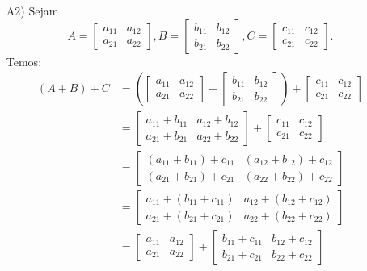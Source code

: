\documentclass[12pt]{exam}
\begin{document}
\begin{itemize}
        \item[A2)] Sejam
        \[
        A = \begin{bmatrix} a_{11} & a_{12}\\a_{21} & a_{22}\end{bmatrix},
        B = \begin{bmatrix} b_{11} & b_{12}\\b_{21} & b_{22}\end{bmatrix},
        C = \begin{bmatrix} c_{11} & c_{12}\\c_{21} & c_{22}\end{bmatrix}.
        \]
        Temos:
        \begin{align*}
            (A + B) + C & = \left(\begin{bmatrix} a_{11} & a_{12}\\a_{21} & a_{22}\end{bmatrix} +
            \begin{bmatrix} b_{11} & b_{12}\\b_{21} & b_{22}\end{bmatrix}\right) +
            \begin{bmatrix} c_{11} & c_{12}\\c_{21} & c_{22}\end{bmatrix}
            \\ &= \begin{bmatrix} a_{11} + b_{11} & a_{12} + b_{12}\\a_{21} + b_{21} & a_{22} + b_{22}\end{bmatrix} +
            \begin{bmatrix} c_{11} & c_{12}\\c_{21} & c_{22}\end{bmatrix}
            \\ &= \begin{bmatrix} (a_{11} + b_{11}) + c_{11} & (a_{12} + b_{12}) + c_{12}\\(a_{21} + b_{21}) + c_{21} & (a_{22} + b_{22}) + c_{22}\end{bmatrix}
            \\ &= \begin{bmatrix} a_{11} + (b_{11} + c_{11}) & a_{12} + (b_{12} + c_{12})\\a_{21} + (b_{21} + c_{21}) & a_{22} + (b_{22} + c_{22})\end{bmatrix}
            \\ &= \begin{bmatrix} a_{11} & a_{12}\\a_{21} & a_{22}\end{bmatrix} + \begin{bmatrix} b_{11} + c_{11} & b_{12} + c_{12}\\b_{21} + c_{21} & b_{22} + c_{22}\end{bmatrix}

\end{align*}
\end{itemize}
\end{document}
